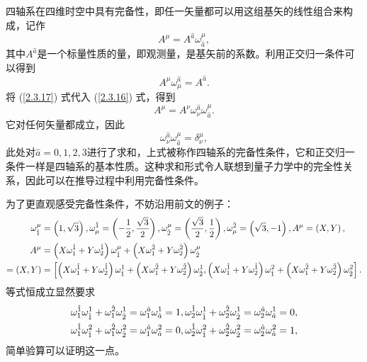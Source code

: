\documentclass[11pt, a4paper, oneside, onecolumn]{ctexart}
\numberwithin{equation}{subsection}
\begin{document}
四轴系在四维时空中具有完备性，即任一矢量都可以用这组基矢的线性组合来构成，记作
\begin{equation}
A^{\mu}=A^{\hat{a}}\omega^{\mu}_{\hat{a}},\label{2.3.16}
\end{equation}
其中$A^{\hat{a}}$是一个标量性质的量，即观测量，是基矢前的系数。利用正交归一条件可以得到
\begin{equation}
A^{\mu}\omega_{\mu}^{\hat{a}}=A^{\hat{a}}.\label{2.3.17}
\end{equation}
将 (\ref{2.3.17}) 式代入 (\ref{2.3.16}) 式，得到
\begin{equation}
A^{\mu}=A^{\nu}\omega_{\nu}^{\hat{a}}\omega_{\hat{a}}^{\mu}.
\end{equation}
它对任何矢量都成立，因此
\begin{equation}
\omega^{\hat{a}}_{\nu}\omega^{\mu}_{\hat{a}}=\delta{}^{\mu}_{\nu},
\end{equation}
此处对$\hat{a}=0,1,2,3$进行了求和，上式被称作四轴系的完备性条件，它和正交归一条件一样是四轴系的基本性质。这种求和形式令人联想到量子力学中的完全性关系，因此可以在推导过程中利用完备性条件。

为了更直观感受完备性条件，不妨沿用前文的例子：
\begin{align}
\omega^{\mu}_{\hat{1}}&=\left(1,\sqrt{3}\right),\omega_{\mu}^{\hat{1}}=\left(-\frac{1}{2},\frac{\sqrt{3}}{2}\right),\omega^{\mu}_{\hat{2}}=\left(\frac{\sqrt{3}}{2},\frac{1}{2}\right),\omega_{\mu}^{\hat{2}}=\left(\sqrt{3},-1\right),A^{\mu}=\left(X,Y\right),\notag\\
A^{\mu}&=\left(X\omega^{\hat{1}}_{1}+Y\omega^{\hat{1}}_{2}\right)\omega^{\mu}_{\hat{1}}+\left(X\omega^{\hat{2}}_{1}+Y\omega^{\hat{2}}_{2}\right)\omega^{\mu}_{\hat{2}}\notag\\
=\left(X,Y\right)&=\left[\left(X\omega^{\hat{1}}_{1}+Y\omega^{\hat{1}}_{2}\right)\omega^{1}_{\hat{1}}+\left(X\omega^{\hat{2}}_{1}+Y\omega^{\hat{2}}_{2}\right)\omega^{1}_{\hat{2}},\left(X\omega^{\hat{1}}_{1}+Y\omega^{\hat{1}}_{2}\right)\omega^{2}_{\hat{1}}+\left(X\omega^{\hat{2}}_{1}+Y\omega^{\hat{2}}_{2}\right)\omega^{2}_{\hat{2}}\right].\notag
\end{align}
等式恒成立显然要求
\begin{align}
\omega^{\hat{1}}_{1}\omega^{1}_{\hat{1}}+\omega^{\hat{2}}_{1}\omega^{1}_{\hat{2}}=\omega^{\hat{a}}_{1}\omega^{1}_{\hat{a}}=1,\omega^{\hat{1}}_{2}\omega^{1}_{\hat{1}}+\omega^{\hat{2}}_{2}\omega^{1}_{\hat{2}}=\omega^{\hat{a}}_{2}\omega^{1}_{\hat{a}}=0,\notag\\
\omega^{\hat{1}}_{1}\omega^{2}_{\hat{1}}+\omega^{\hat{2}}_{1}\omega^{2}_{\hat{2}}=\omega^{\hat{a}}_{1}\omega^{2}_{\hat{a}}=0,\omega^{\hat{1}}_{2}\omega^{2}_{\hat{1}}+\omega^{\hat{2}}_{2}\omega^{2}_{\hat{2}}=\omega^{\hat{a}}_{2}\omega^{2}_{\hat{a}}=1,\notag
\end{align}
简单验算可以证明这一点。
\end{document}
